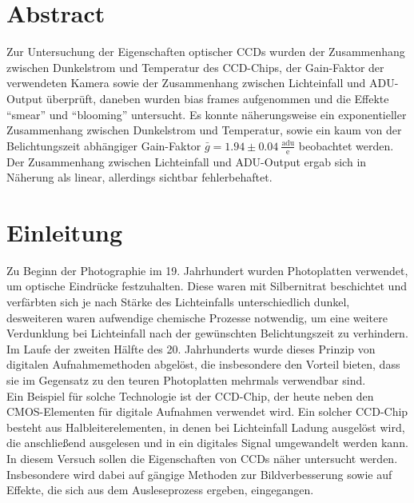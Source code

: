 \section{Abstract}
Zur Untersuchung der Eigenschaften optischer CCDs wurden der Zusammenhang zwischen Dunkelstrom und Temperatur des CCD-Chips, der Gain-Faktor der verwendeten Kamera sowie der Zusammenhang zwischen Lichteinfall und ADU-Output überprüft, daneben wurden bias frames aufgenommen und die Effekte \enquote{smear} und \enquote{blooming} untersucht. Es konnte näherungsweise ein exponentieller Zusammenhang zwischen Dunkelstrom und Temperatur, sowie ein kaum von der Belichtungszeit abhängiger Gain-Faktor $\bar{g} = 1.94 \pm 0.04 \ \frac{\mathrm{adu}}{\mathrm{e}}$ beobachtet werden. Der Zusammenhang zwischen Lichteinfall und ADU-Output ergab sich in Näherung als linear, allerdings sichtbar fehlerbehaftet. 

\newpage
\section{Einleitung}
Zu Beginn der Photographie im 19. Jahrhundert wurden Photoplatten verwendet, um optische Eindrücke festzuhalten. Diese waren mit Silbernitrat beschichtet und verfärbten sich je nach Stärke des Lichteinfalls unterschiedlich dunkel, desweiteren waren aufwendige chemische Prozesse notwendig, um eine weitere Verdunklung bei Lichteinfall nach der gewünschten Belichtungszeit zu verhindern. Im Laufe der zweiten Hälfte des 20. Jahrhunderts wurde dieses Prinzip von digitalen Aufnahmemethoden abgelöst, die insbesondere den Vorteil bieten, dass sie im Gegensatz zu den teuren Photoplatten mehrmals verwendbar sind. \\
Ein Beispiel für solche Technologie ist der CCD-Chip, der heute neben den CMOS-Elementen für digitale Aufnahmen verwendet wird. Ein solcher CCD-Chip besteht aus Halbleiterelementen, in denen bei Lichteinfall Ladung ausgelöst wird, die anschließend ausgelesen und in ein digitales Signal umgewandelt werden kann. \\
In diesem Versuch sollen die Eigenschaften von CCDs näher untersucht werden. Insbesondere wird dabei auf gängige Methoden zur Bildverbesserung sowie auf Effekte, die sich aus dem Ausleseprozess ergeben, eingegangen. 